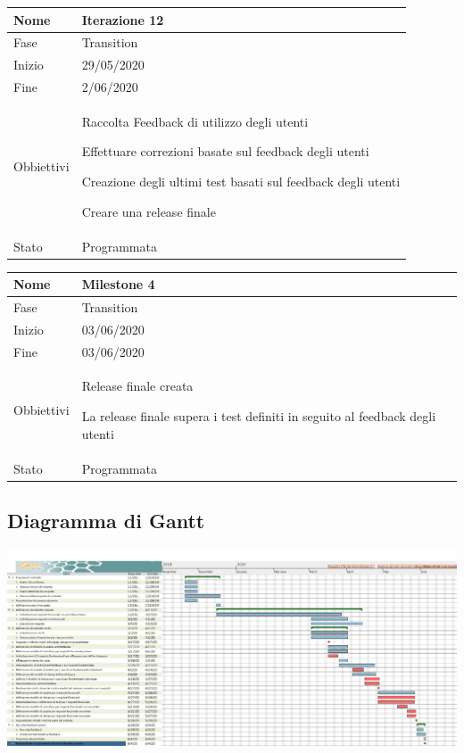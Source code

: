 \begin{center}
\begin{tabular}{ |p{2cm}|p{10cm}|  }
\hline
Nome & Iterazione 12 \\\hline
Fase & Transition \\\hline
Inizio & 29/05/2020 \\\hline
Fine &  2/06/2020  \\\hline
Obbiettivi & 
	\begin{compactitem}
		\item Raccolta Feedback di utilizzo degli utenti
		\item Effettuare correzioni basate sul feedback degli utenti
		\item Creazione degli ultimi test basati sul feedback degli utenti
		\item Creare una release finale
	\end{compactitem}\\\hline
Stato &  Programmata \\\hline
\end{tabular}
\label{table:12}\newline

\begin{tabular}{ |p{2cm}|p{10cm}|  }
\hline
Nome & Milestone 4\\\hline
Fase & Transition \\\hline
Inizio & 03/06/2020 \\\hline
Fine &  03/06/2020 \\\hline
Obbiettivi & 
	\begin{compactitem}
		\item Release finale creata
		\item La release finale supera i test definiti in seguito al feedback degli utenti
	\end{compactitem}\\\hline
Stato &  Programmata \\\hline
\end{tabular}
\label{table:milestone4}\newline


\end{center}

\subsection{Diagramma di Gantt}
\vspace{0.5cm}
\begin{center}
	\hspace*{-2cm}\includegraphics[width=16cm]{../Contents/Diagrams/Gantt_Chart/Gantt_NexiFy.png}
\end{center}
\vspace{2cm}


